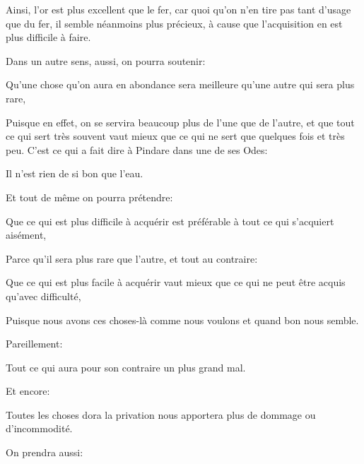 Ainsi, l'or est plus excellent que le fer, car quoi qu'on n'en tire pas tant d'usage que du fer, il semble néanmoins plus
précieux, à cause que l'acquisition en est plus difficile à faire.

Dans un autre sens, aussi, on pourra soutenir:

\begin{emphpar}
    Qu'une chose qu'on aura en abondance sera meilleure qu'une autre qui sera plus rare,
\end{emphpar}

Puisque en effet, on se servira beaucoup plus de l'une que de l'autre, et que tout ce qui sert très souvent vaut mieux que
ce qui ne sert que quelques fois et très peu. C'est ce qui a fait dire à Pindare dans une de ses Odes:

\begin{emphpar}
    Il n'est rien de si bon que l'eau.
\end{emphpar}

\bigbreak

Et tout de même on pourra prétendre:

\begin{emphpar}
    Que ce qui est plus difficile à acquérir est préférable à tout ce qui s'acquiert aisément,
\end{emphpar}

Parce qu'il sera plus rare que l'autre, et tout au contraire:

\begin{emphpar}
    Que ce qui est plus facile à acquérir vaut mieux que ce qui ne peut être acquis qu'avec difficulté,
\end{emphpar}

Puisque nous avons ces choses-là comme nous voulons et quand bon nous semble.

\bigbreak

Pareillement:

\begin{emphpar}
    Tout ce qui aura pour son contraire un plus grand mal.
\end{emphpar}

\bigbreak

Et encore:

\begin{emphpar}
    Toutes les choses dora la privation nous apportera plus de dommage ou d'incommodité.
\end{emphpar}

\bigbreak

On prendra aussi:

